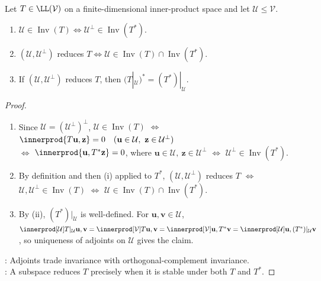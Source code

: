 \begin{theorem} \label{thm:adjoint-invariant-subspace-orthogonal-complement} \\
Let $T\in\LL(\mathcal{V})$ on a finite-dimensional inner-product space and let $\mathcal{U}\leq\mathcal{V}$.
\begin{enumerate}[label=(\roman*)]
\setlength{\itemsep}{0pt}
\item $\mathcal{U}\in\operatorname{Inv}(T)\Longleftrightarrow\mathcal{U}^{\perp}\in\operatorname{Inv}(T^*)$.
\item $(\mathcal{U},\mathcal{U}^{\perp})$ reduces $T\Longleftrightarrow\mathcal{U}\in\operatorname{Inv}(T)\cap\operatorname{Inv}(T^*)$.
\item If $(\mathcal{U},\mathcal{U}^{\perp})$ reduces $T$, then $(T|_{\mathcal{U}})^*=(T^*)|_{\mathcal{U}}$.
\end{enumerate}
\begin{proof}
\begin{enumerate}[label=(\roman*)]
\setlength{\itemsep}{0pt}
\item Since $\mathcal{U}=(\mathcal{U}^{\perp})^{\perp}$, $\mathcal{U}\in\operatorname{Inv}(T)$ $\Longleftrightarrow$ $\innerprod{T\mathbf{u},\mathbf{z}}=0\quad(\mathbf{u}\in\mathcal{U},\ \mathbf{z}\in\mathcal{U}^{\perp})$\\
$\Longleftrightarrow$ $\innerprod{\mathbf{u},T^*\mathbf{z}}=0$, where $\mathbf{u}\in\mathcal{U},\ \mathbf{z}\in\mathcal{U}^{\perp}$ $\Longleftrightarrow$ $\mathcal{U}^{\perp}\in\operatorname{Inv}(T^*)$.
\item By definition and then (i) applied to $T^*$, $(\mathcal{U},\mathcal{U}^{\perp})$ reduces $T$ $\Longleftrightarrow$ $\mathcal{U},\mathcal{U}^{\perp}\in\operatorname{Inv}(T)$ $\Longleftrightarrow$ $\mathcal{U}\in\operatorname{Inv}(T)\cap\operatorname{Inv}(T^*)$.
\item By (ii), $(T^*)|_{\mathcal{U}}$ is well-defined. For $\mathbf{u},\mathbf{v}\in\mathcal{U}$,\\
$\innerprod[\mathcal{U}]{T|_{\mathcal{U}}\mathbf{u},\mathbf{v}} =\innerprod[\mathcal{V}]{T\mathbf{u},\mathbf{v}} =\innerprod[\mathcal{V}]{\mathbf{u},T^*\mathbf{v}} =\innerprod[\mathcal{U}]{\mathbf{u},(T^*)|_{\mathcal{U}}\mathbf{v}}$, so uniqueness of adjoints on $\mathcal{U}$ gives the claim.
\end{enumerate}
: Adjoints trade invariance with orthogonal-complement invariance.\\
: A subspace reduces $T$ precisely when it is stable under both $T$ and $T^*$.
\end{proof}
\end{theorem}

